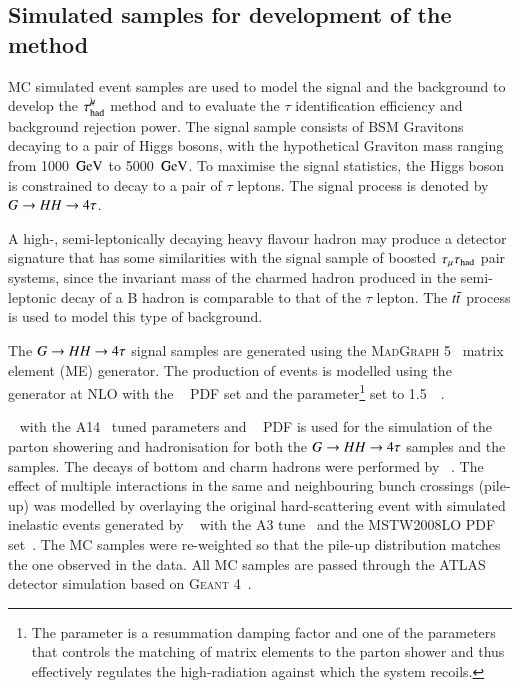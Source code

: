     \subsection{Simulated samples for development of the method} \label{sec:DevelopmentMC}
        MC simulated event samples are used to model the signal and the background to develop 
        the $\tau_\mathrm{had}^{\mu\mkern-10mu\backslash}$ method and  to evaluate  the $\tau$ identification efficiency
        and background rejection power. The signal sample consists of BSM Gravitons~\cite{Graviton_theory} 
        decaying to a pair of Higgs bosons, with the hypothetical Graviton mass ranging from 
        1000~$\text{GeV}$ to 5000~$\text{GeV}$. To maximise the signal statistics, the Higgs boson is constrained to decay to 
        a pair of $\tau$ leptons. The signal process is denoted by $G \rightarrow HH \rightarrow 4\tau$. 

        A high-\pT, semi-leptonically decaying heavy flavour hadron may produce a detector signature that has some similarities with 
        the signal sample of boosted $\tau_\mathrm{\mu}\tau_\mathrm{had}$ pair systems, since the invariant mass of the charmed hadron produced in the 
        semi-leptonic decay of a B hadron is comparable to that of the $\tau$ lepton. 
        The $t\bar{t}$ process is used to model this type of background.

        The $G \rightarrow HH \rightarrow 4\tau$ signal samples are generated using the \textsc{MadGraph 5}~\cite{Alwall:2014hca} matrix element (ME) generator. 
        The production of \ttbar events is modelled using the
        \POWHEGBOX[v2]~\cite{Frixione:2007nw,Nason:2004rx,Frixione:2007vw,Alioli:2010xd}
        generator at NLO with the \NNPDF[3.0nlo]~\cite{Ball:2014uwa} PDF set
        and the \hdamp parameter\footnote{The
        \hdamp parameter is a resummation damping factor and one of the
        parameters that controls the matching of \POWHEG matrix elements to
        the parton shower and thus effectively regulates the
        high-\pT radiation against which the \ttbar system recoils.} set
        to 1.5~\mtop ~\cite{ATL-PHYS-PUB-2016-020}.

        \PYTHIA~\cite{Sjostrand:2014zea} with the A14~\cite{ATL-PHYS-PUB-2014-021} tuned parameters and \NNPDF[2.3lo]~\cite{Ball:2012cx} 
        PDF is used for the simulation of the parton showering and hadronisation for both the $G \rightarrow HH \rightarrow 4\tau$ samples and
        the \ttbar samples. The decays of bottom and charm hadrons were performed by \EVTGEN[1.6.0]~\cite{Lange:2001uf}.
        The effect of multiple interactions in the same and neighbouring bunch crossings (pile-up) was modelled
        by overlaying the original hard-scattering
        event with simulated inelastic events generated by
        \PYTHIA[8.186]~\cite{Sjostrand:2014zea} with the A3 tune~\cite{ATL-PHYS-PUB-2016-017} 
        and the MSTW2008LO PDF set~\cite{Martin:2009iq}.
        The MC samples were re-weighted so that the pile-up distribution matches the one observed in the data.
        All MC samples are passed  through the 
        ATLAS detector simulation based on \textsc{Geant 4}~\cite{Agostinelli:2002hh}. 

